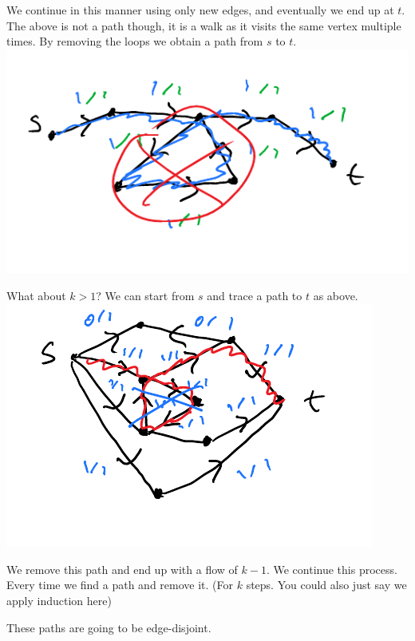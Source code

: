 \documentclass[12 pt]{article}
\begin{document}
        We continue in this manner using only new edges, and
        eventually we end up at $t$. The above is not a path though,
        it is a walk as it visits the same vertex multiple times. By
        removing the loops we obtain a path from $s$ to $t$.
        \\ \includegraphics[width=.9\textwidth]{i72.pdf}

        What about $k>1$? We can start from $s$ and trace a path to
        $t$ as above.
        \\ \includegraphics[width=.9\textwidth]{i73.pdf}

        We remove this path and end up with a flow of $k-1$. We
        continue this process. Every time we find a path and remove
        it. (For $k$ steps. You could also just say we apply induction
        here)

        These paths are going to be edge-disjoint.
\end{document}
